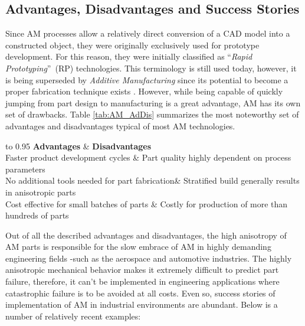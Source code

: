 \documentclass[main.tex]{subfiles}
\begin{document}
\subsection{Advantages, Disadvantages and Success Stories}\label{subsec:AMAdDis} 
Since AM processes allow a relatively direct conversion of a CAD model into a constructed object, they were originally exclusively used for prototype development. For this reason, they were initially classified as \textquotedblleft \emph{Rapid Prototyping}\textquotedblright~(RP) technologies. This terminology is still used today, however, it is being superseded by \emph{Additive Manufacturing} since its potential to become a proper fabrication technique exists \cite{Gibson2015}. However, while being capable of quickly jumping from part design to manufacturing is a great advantage, AM has its own set of drawbacks. Table \ref{tab:AM_AdDis} summarizes the most noteworthy set of advantages and disadvantages typical of most AM technologies.

\begin{table}[h]
	\centering
	\caption{Advantages and Disadvantages of Additive Manufacturing}
	\label{tab:AM_AdDis}
	\begin{tabu} to 0.95\textwidth {  X[c]  X[c] }
		\hline
		\textbf{Advantages} & \textbf{Disadvantages} \\ 
		\hline
		Faster product development cycles \cite{Gibson2015} & Part quality highly dependent on process parameters \cite{Gibson2015}\\
		No additional tools needed for part fabrication\cite{Gibson2015}&  Stratified build generally results in anisotropic parts \cite{Gibson2015, Capote2017}\\
		Cost effective for small batches of parts \cite{Baumers2016,Conner2014,Berman2012}&  Costly for production of more than hundreds of parts \cite{Baumers2016,Conner2014,Berman2012}\\
		\hline
	\end{tabu}
\end{table}   

Out of all the described advantages and disadvantages, the high anisotropy of AM parts is responsible for the slow embrace of AM in highly demanding engineering fields -such as the aerospace and automotive industries. The highly anisotropic mechanical behavior makes it extremely difficult to predict part failure, therefore, it can't be implemented in engineering applications where catastrophic failure is to be avoided at all costs. Even so, success stories of implementation of AM in industrial environments are abundant. Below is a number of relatively 
recent examples:
\end{document}
